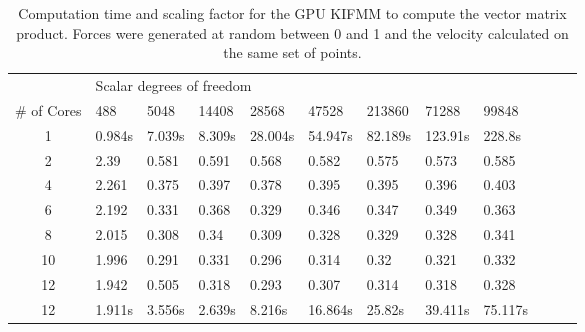 \begin{table}[ht]
    \centering
    \setlength{\tabcolsep}{6pt}
    \renewcommand{\arraystretch}{1.4}
    \caption[Computation time and scaling factor for the GPU KIFMM to compute the vector matrix product.]{Computation time and scaling factor for the GPU KIFMM to compute the vector matrix product. Forces were generated at random between 0 and 1 and the velocity calculated on the same set of points.}
    \small
    \begin{tabular}{c|lllllllllll}
     & \multicolumn{8}{l}{Scalar degrees of freedom} \\ \cline{2-9}
    \# of Cores & 488 & 5048 & 14408 & 28568 & 47528 & 213860 & 71288 & 99848 \\ \hline
    1 & 0.984s & 7.039s & 8.309s & 28.004s & 54.947s & 82.189s & 123.91s & 228.8s \\ \hline
    2 & 2.39 & 0.581 & 0.591 & 0.568 & 0.582 & 0.575 & 0.573 & 0.585 \\
    4 & 2.261 & 0.375 & 0.397 & 0.378 & 0.395 & 0.395 & 0.396 & 0.403 \\
    6 & 2.192 & 0.331 & 0.368 & 0.329 & 0.346 & 0.347 & 0.349 & 0.363 \\
    8 & 2.015 & 0.308 & 0.34 & 0.309 & 0.328 & 0.329 & 0.328 & 0.341 \\
    10 & 1.996 & 0.291 & 0.331 & 0.296 & 0.314 & 0.32 & 0.321 & 0.332 \\
    12 & 1.942 & 0.505 & 0.318 & 0.293 & 0.307 & 0.314 & 0.318 & 0.328 \\ \hline
    12 & 1.911s & 3.556s & 2.639s & 8.216s & 16.864s & 25.82s & 39.411s & 75.117s \\
    \end{tabular}
    \label{tab:GPUparalisation}
\end{table}



